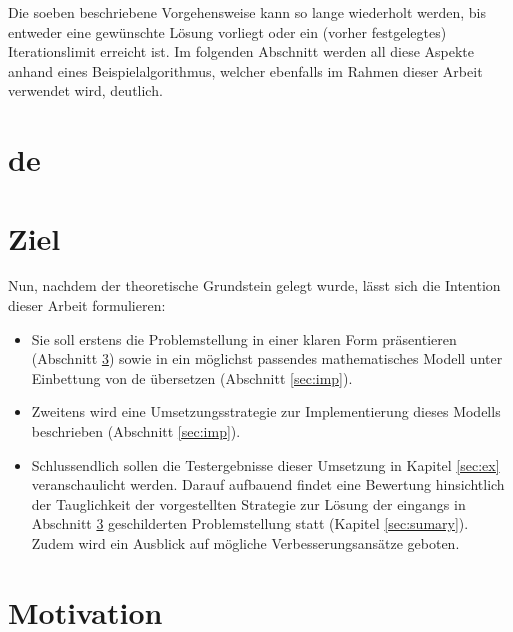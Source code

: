		Die soeben beschriebene Vorgehensweise kann so lange wiederholt werden, bis entweder eine gewünschte Lösung vorliegt oder ein (vorher festgelegtes) Iterationslimit erreicht ist. Im folgenden Abschnitt werden all diese Aspekte anhand eines Beispielalgorithmus, welcher ebenfalls im Rahmen dieser Arbeit verwendet wird, deutlich.\\
		
		
		
	
	\section{\gls{de}}
	\label{sec:de}
	
	\section{Ziel}
	\label{sec:ziel}
	
		Nun, nachdem der theoretische Grundstein gelegt wurde, lässt sich die Intention dieser Arbeit formulieren:
		\begin{itemize}
			\item Sie soll erstens die Problemstellung in einer klaren Form präsentieren (Abschnitt \ref{sec:motivation}) sowie in ein möglichst passendes mathematisches Modell unter Einbettung von \gls{de} übersetzen (Abschnitt \ref{sec:imp}).
			\item Zweitens wird eine Umsetzungsstrategie zur Implementierung dieses Modells beschrieben (Abschnitt \ref{sec:imp}).
			\item Schlussendlich sollen die Testergebnisse dieser Umsetzung in Kapitel \ref{sec:ex} veranschaulicht werden. Darauf aufbauend findet eine Bewertung hinsichtlich der Tauglichkeit der vorgestellten Strategie zur Lösung der eingangs in Abschnitt \ref{sec:motivation} geschilderten Problemstellung statt (Kapitel \ref{sec:sumary}). Zudem wird ein Ausblick auf mögliche Verbesserungsansätze geboten. 
		\end{itemize}
	
	\section{Motivation}
	\label{sec:motivation}